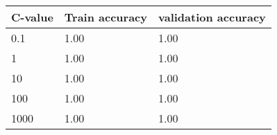 \def\arraystretch{1.25}
\begin{center}
\begin{longtable}{l l l }
\hline
\hline
\textbf{C-value} & \textbf{Train accuracy} & \textbf{validation accuracy} \\
\hline
\hline
0.1 & 1.00 & 1.00\\
1 & 1.00 & 1.00\\
10 & 1.00 & 1.00\\
100 & 1.00 & 1.00\\
1000 & 1.00 & 1.00\\
\hline
\end{longtable}
\setcounter{table}{0}
\end{center}